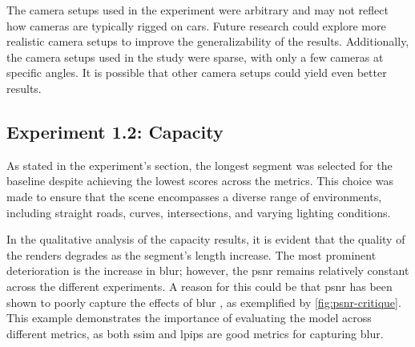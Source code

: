 The camera setups used in the experiment were arbitrary and may not reflect how cameras are typically rigged on cars. Future research could explore more realistic camera setups to improve the generalizability of the results. Additionally, the camera setups used in the study were sparse, with only a few cameras at specific angles. It is possible that other camera setups could yield even better results.


\begin{comment}
- The position of the camera was arbitrary. Could've done more research into how cameras on cars usually are rigged.
- The camera setups are very sparse, a lot of different possibilities.

Results:
- Relatively little difference in the quantitative results.
- Why did the -10 and 10 yaw yield the best SSIM and LPIPS?
- The evaluation images are a subset of the training images. Because the -10 and 10 have a lot of overlap, they have a lot of common training data which will allow the model to learn the scene which it is evaluated on, in turn yielding high scores on the chosen metrics.


This overlap allows the model to train and learn the scene which it is evaluated on, because the evaluation set is a subset of the training images, more than the other setups, and it'll naturally score high on the respective images.

the model to train on the partial scene with two times the amount of data, and since the evaluation set is a subset of the training images, it'll naturally score high on the respective images.

\end{comment}










\subsection{Experiment 1.2: Capacity} 
As stated in the experiment's section, the longest segment was selected for the baseline despite achieving the lowest scores across the metrics. This choice was made to ensure that the scene encompasses a diverse range of environments, including straight roads, curves, intersections, and varying lighting conditions.

In the qualitative analysis of the capacity results, it is evident that the quality of the renders degrades as the segment's length increase. The most prominent deterioration is the increase in blur; however, the \acrshort{psnr} remains relatively constant across the different experiments. A reason for this could be that \acrshort{psnr} has been shown to poorly capture the effects of blur \cite{videoprocessingai}, as exemplified by \autoref{fig:psnr-critique}. This example demonstrates the importance of evaluating the model across different metrics, as both \acrshort{ssim} and \acrshort{lpips} are good metrics for capturing blur.

